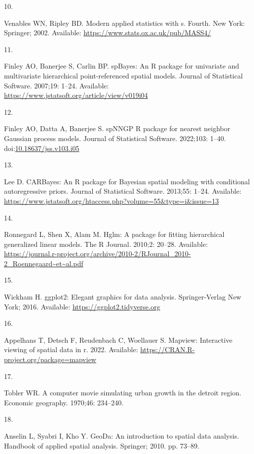 \documentclass[10pt,letterpaper]{article}
\newlength{\cslhangindent}
\newlength{\csllabelwidth}
\newlength{\cslentryspacingunit} %
\newenvironment{CSLReferences}[2] %
 {%
  \setlength{\parindent}{0pt}
  \ifodd #1
  \let\oldpar\par
  \def\par{\hangindent=\cslhangindent\oldpar}
  \fi
  \setlength{\parskip}{#2\cslentryspacingunit}
 }%
 {}
\newcommand{\CSLLeftMargin}[1]{\parbox[t]{\csllabelwidth}{#1}}
\newcommand{\CSLRightInline}[1]{\parbox[t]{\linewidth - \csllabelwidth}{#1}\break}
\begin{document}
\begin{CSLReferences}{0}{0}
\leavevmode\hypertarget{ref-venables2002S}{}%
\CSLLeftMargin{10. }
\CSLRightInline{Venables WN, Ripley BD. Modern applied statistics with
s. Fourth. New York: Springer; 2002. Available:
\url{https://www.stats.ox.ac.uk/pub/MASS4/}}

\leavevmode\hypertarget{ref-finley2007spbayes}{}%
\CSLLeftMargin{11. }
\CSLRightInline{Finley AO, Banerjee S, Carlin BP. {spBayes}: An {R}
package for univariate and multivariate hierarchical point-referenced
spatial models. Journal of Statistical Software. 2007;19: 1--24.
Available: \url{https://www.jstatsoft.org/article/view/v019i04}}

\leavevmode\hypertarget{ref-finley2002spnngp}{}%
\CSLLeftMargin{12. }
\CSLRightInline{Finley AO, Datta A, Banerjee S. {spNNGP} {R} package for
nearest neighbor {G}aussian process models. Journal of Statistical
Software. 2022;103: 1--40.
doi:\href{https://doi.org/10.18637/jss.v103.i05}{10.18637/jss.v103.i05}}

\leavevmode\hypertarget{ref-lee2013carbayes}{}%
\CSLLeftMargin{13. }
\CSLRightInline{Lee D. {CARBayes}: An {R} package for {B}ayesian spatial
modeling with conditional autoregressive priors. Journal of Statistical
Software. 2013;55: 1--24. Available:
\url{https://www.jstatsoft.org/htaccess.php?volume=55\&type=i\&issue=13}}

\leavevmode\hypertarget{ref-ronnegard2010hglm}{}%
\CSLLeftMargin{14. }
\CSLRightInline{Ronnegard L, Shen X, Alam M. Hglm: A package for fitting
hierarchical generalized linear models. The R Journal. 2010;2: 20--28.
Available:
\url{https://journal.r-project.org/archive/2010-2/RJournal_2010-2_Roennegaard~et~al.pdf}}

\leavevmode\hypertarget{ref-wickham2016ggplot2}{}%
\CSLLeftMargin{15. }
\CSLRightInline{Wickham H. ggplot2: Elegant graphics for data analysis.
Springer-Verlag New York; 2016. Available:
\url{https://ggplot2.tidyverse.org}}

\leavevmode\hypertarget{ref-appelhans2022mapview}{}%
\CSLLeftMargin{16. }
\CSLRightInline{Appelhans T, Detsch F, Reudenbach C, Woellauer S.
Mapview: Interactive viewing of spatial data in r. 2022. Available:
\url{https://CRAN.R-project.org/package=mapview}}

\leavevmode\hypertarget{ref-tobler1970computer}{}%
\CSLLeftMargin{17. }
\CSLRightInline{Tobler WR. A computer movie simulating urban growth in
the detroit region. Economic geography. 1970;46: 234--240. }

\leavevmode\hypertarget{ref-anselin2010geoda}{}%
\CSLLeftMargin{18. }
\CSLRightInline{Anselin L, Syabri I, Kho Y. GeoDa: An introduction to
spatial data analysis. Handbook of applied spatial analysis. Springer;
2010. pp. 73--89. }


\end{CSLReferences}
\end{document}
